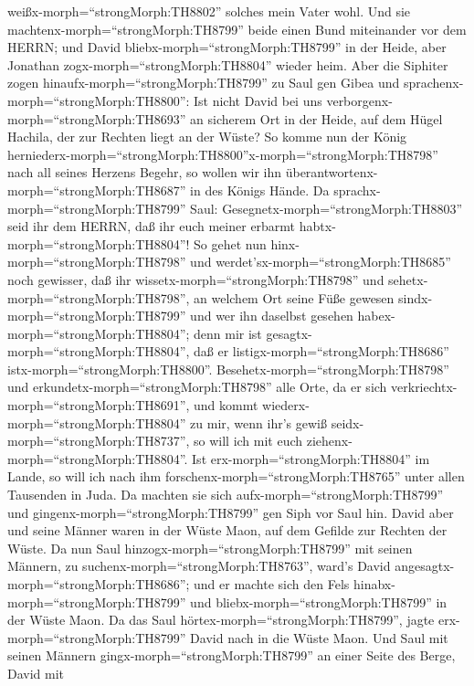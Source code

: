 weißx-morph=``strongMorph:TH8802'' solches mein Vater wohl.
 Und sie machtenx-morph=``strongMorph:TH8799'' beide einen
Bund miteinander vor dem HERRN; und David
bliebx-morph=``strongMorph:TH8799'' in der Heide, aber Jonathan
zogx-morph=``strongMorph:TH8804'' wieder heim.  Aber die
Siphiter zogen hinaufx-morph=``strongMorph:TH8799'' zu Saul gen Gibea
und sprachenx-morph=``strongMorph:TH8800'': Ist nicht David bei uns
verborgenx-morph=``strongMorph:TH8693'' an sicherem Ort in der Heide,
auf dem Hügel Hachila, der zur Rechten liegt an der Wüste? 
So komme nun der König
herniederx-morph=``strongMorph:TH8800''x-morph=``strongMorph:TH8798''
nach all seines Herzens Begehr, so wollen wir ihn
überantwortenx-morph=``strongMorph:TH8687'' in des Königs Hände.
 Da sprachx-morph=``strongMorph:TH8799'' Saul:
Gesegnetx-morph=``strongMorph:TH8803'' seid ihr dem HERRN, daß ihr euch
meiner erbarmt habtx-morph=``strongMorph:TH8804''!  So
gehet nun hinx-morph=``strongMorph:TH8798'' und
werdet'sx-morph=``strongMorph:TH8685'' noch gewisser, daß ihr
wissetx-morph=``strongMorph:TH8798'' und
sehetx-morph=``strongMorph:TH8798'', an welchem Ort seine Füße gewesen
sindx-morph=``strongMorph:TH8799'' und wer ihn daselbst gesehen
habex-morph=``strongMorph:TH8804''; denn mir ist
gesagtx-morph=``strongMorph:TH8804'', daß er
listigx-morph=``strongMorph:TH8686'' istx-morph=``strongMorph:TH8800''.
 Besehetx-morph=``strongMorph:TH8798'' und
erkundetx-morph=``strongMorph:TH8798'' alle Orte, da er sich
verkriechtx-morph=``strongMorph:TH8691'', und kommt
wiederx-morph=``strongMorph:TH8804'' zu mir, wenn ihr's gewiß
seidx-morph=``strongMorph:TH8737'', so will ich mit euch
ziehenx-morph=``strongMorph:TH8804''. Ist
erx-morph=``strongMorph:TH8804'' im Lande, so will ich nach ihm
forschenx-morph=``strongMorph:TH8765'' unter allen Tausenden in Juda.
 Da machten sie sich aufx-morph=``strongMorph:TH8799'' und
gingenx-morph=``strongMorph:TH8799'' gen Siph vor Saul hin. David aber
und seine Männer waren in der Wüste Maon, auf dem Gefilde zur Rechten
der Wüste.  Da nun Saul
hinzogx-morph=``strongMorph:TH8799'' mit seinen Männern, zu
suchenx-morph=``strongMorph:TH8763'', ward's David
angesagtx-morph=``strongMorph:TH8686''; und er machte sich den Fels
hinabx-morph=``strongMorph:TH8799'' und
bliebx-morph=``strongMorph:TH8799'' in der Wüste Maon. Da das Saul
hörtex-morph=``strongMorph:TH8799'', jagte
erx-morph=``strongMorph:TH8799'' David nach in die Wüste Maon.
 Und Saul mit seinen Männern
gingx-morph=``strongMorph:TH8799'' an einer Seite des Berge, David mit
